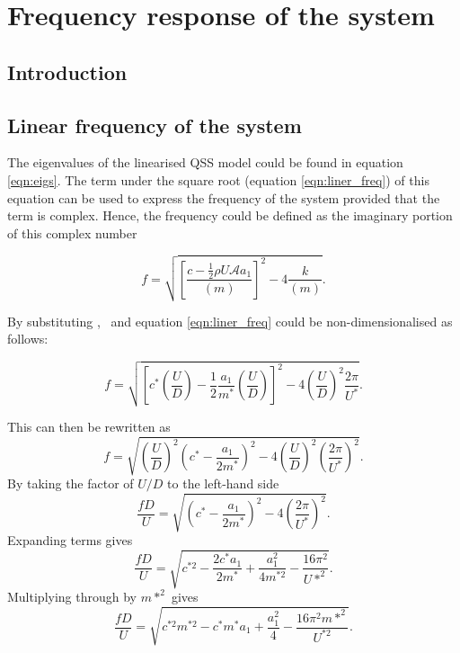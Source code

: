 \chapter{Frequency response of the system}

\section{Introduction}

\section{Linear frequency of the system}

The eigenvalues of the linearised QSS model could be found in equation \ref{eqn:eigs}. The term under the square root (equation \ref{eqn:liner_freq}) of this equation can be used to express the frequency of the system provided that the term is complex. Hence, the frequency could be defined as the imaginary portion of this complex number


\begin{equation}
\label{eqn:liner_freq}
f = \sqrt{\left[\frac{c-\frac{1}{2}\rho U\mathcal{A}a_1}{(m)}\right]^2-4\frac{k}{(m)}}.
\end{equation}



By substituting \cstar, \mstar\ and \ustar equation \ref{eqn:liner_freq} could be non-dimensionalised as follows:

\begin{equation}
f = \sqrt{\left[c^*\left(\frac{U}{D}\right) - \frac{1}{2}\frac{a_1}{m^*}\left(\frac{U}{D}\right)\right]^2 - 4\left(\frac{U}{D}\right)^2\frac{2\pi}{U^*}}.
\end{equation}

This can then be rewritten as
\begin{equation}
f = \sqrt{\left(\frac{U}{D}\right)^2\left(c^*-\frac{a_1}{2m^*}\right)^2 - 4\left(\frac{U}{D}\right)^2\left(\frac{2\pi}{U^*}\right)^2}.
\end{equation}
By taking the factor of $U/D$ to the left-hand side
\begin{equation}
\frac{fD}{U} = \sqrt{\left(c^*-\frac{a_1}{2m^*}\right)^2 - 4\left(\frac{2\pi}{U^*}\right)^2}.
\end{equation}
Expanding terms gives
\begin{equation}
\frac{fD}{U} = \sqrt{c^{*2} - \frac{2c^*a_1}{2m^*} + \frac{a_1^2}{4m^{*2}} - \frac{16\pi^2}{U*^2}}.
\end{equation}
Multiplying through by $m*^2$ gives
\begin{equation}
\frac{fD}{U} = \sqrt{c^{*2}m^{*2} - c^*m^*a_1 + \frac{a_1^2}{4} - \frac{16\pi^2m{*^2}}{U^{*2}}}.
\end{equation}


